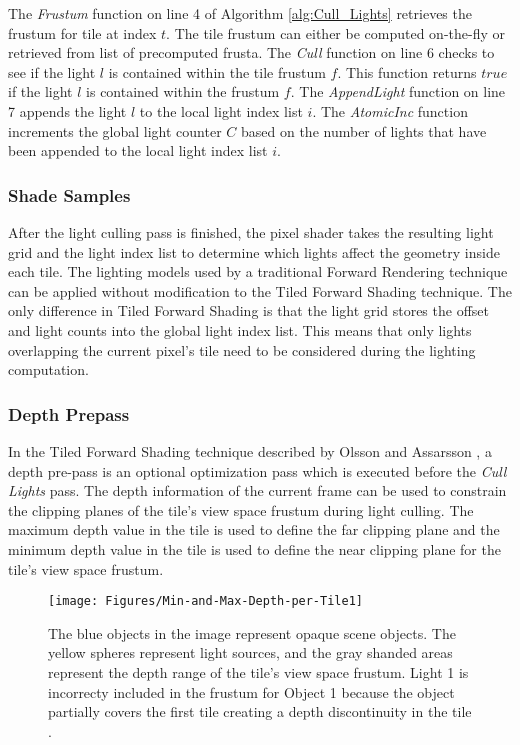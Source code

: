The \emph{Frustum} function on line 4 of Algorithm \ref{alg:Cull_Lights} retrieves the frustum for tile at index $t$. The tile frustum can either be computed on-the-fly or retrieved from list of precomputed frusta. The \emph{Cull} function on line 6 checks to see if the light $l$ is contained within the tile frustum $f$. This function returns $true$ if the light $l$ is contained within the frustum $f$. The \emph{AppendLight} function on line 7 appends the light $l$ to the local light index list $i$. The \emph{AtomicInc} function increments the global light counter $C$ based on the number of lights that have been appended to the local light index list $i$.

\subsubsection{Shade Samples}

After the light culling pass is finished, the pixel shader takes the resulting light grid and the light index list to determine which lights affect the geometry inside each tile. The lighting models used by a traditional Forward Rendering technique can be applied without modification to the Tiled Forward Shading technique. The only difference in Tiled Forward Shading is that the light grid stores the offset and light counts into the global light index list. This means that only lights overlapping the current pixel's tile need to be considered during the lighting computation.

\subsubsection{Depth Prepass}

In the Tiled Forward Shading technique described by Olsson and Assarsson \parencite{13_olssonassarsson_2011}, a depth pre-pass is an optional optimization pass which is executed before the \emph{Cull Lights} pass. The depth information of the current frame can be used to constrain the clipping planes of the tile's view space frustum during light culling. The maximum depth value in the tile is used to define the far clipping plane and the minimum depth value in the tile is used to define the near clipping plane for the tile's view space frustum.

\begin{figure}[H]
\centering
\texttt{[image: Figures/Min-and-Max-Depth-per-Tile1]}
\decoRule
\caption{The blue objects in the image represent opaque scene objects. The yellow spheres represent light sources, and the gray shanded areas represent the depth range of the tile's view space frustum. Light 1 is incorrecty included in the frustum for Object 1 because the object partially covers the first tile creating a depth discontinuity in the tile \parencite{17_vanoosten_2015}.}
\label{fig:Min-and-Max-Depth-per-Tile}
\end{figure}

